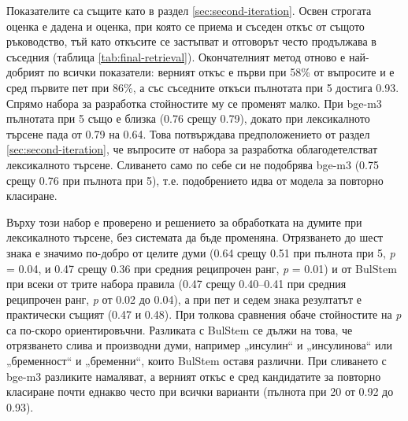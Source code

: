 \documentclass[12pt,a4paper]{article}
\makeatletter
\renewcommand\paragraph{\@startsection{paragraph}{4}{\z@}{1.5ex \@plus .5ex \@minus .2ex}{-1em}{\normalfont\normalsize\bfseries}}
\makeatother
\begin{document}
\paragraph{Извличане.} Показателите са същите като в раздел \ref{sec:second-iteration}. Освен строгата оценка е дадена и оценка, при която се приема и съседен откъс от същото ръководство, тъй като откъсите се застъпват и отговорът често продължава в съседния (таблица \ref{tab:final-retrieval}). Окончателният метод отново е най-добрият по всички показатели: верният откъс е първи при 58\% от въпросите и е сред първите пет при 86\%, а със съседните откъси пълнотата при 5 достига 0.93. Спрямо набора за разработка стойностите му се променят малко. При bge-m3 пълнотата при 5 също е близка (0.76 срещу 0.79), докато при лексикалното търсене пада от 0.79 на 0.64. Това потвърждава предположението от раздел \ref{sec:second-iteration}, че въпросите от набора за разработка облагодетелстват лексикалното търсене. Сливането само по себе си не подобрява bge-m3 (0.75 срещу 0.76 при пълнота при 5), т.е. подобрението идва от модела за повторно класиране.

Върху този набор е проверено и решението за обработката на думите при лексикалното търсене, без системата да бъде променяна. Отрязването до шест знака е значимо по-добро от целите думи (0.64 срещу 0.51 при пълнота при 5, \textit{p} = 0.04, и 0.47 срещу 0.36 при средния реципрочен ранг, \textit{p} = 0.01) и от BulStem при всеки от трите набора правила (0.47 срещу 0.40--0.41 при средния реципрочен ранг, \textit{p} от 0.02 до 0.04), а при пет и седем знака резултатът е практически същият (0.47 и 0.48). При толкова сравнения обаче стойностите на \textit{p} са по-скоро ориентировъчни. Разликата с BulStem се дължи на това, че отрязването слива и производни думи, например „инсулин“ и „инсулинова“ или „бременност“ и „бременни“, които BulStem оставя различни. При сливането с bge-m3 разликите намаляват, а верният откъс е сред кандидатите за повторно класиране почти еднакво често при всички варианти (пълнота при 20 от 0.92 до 0.93).
\end{document}

